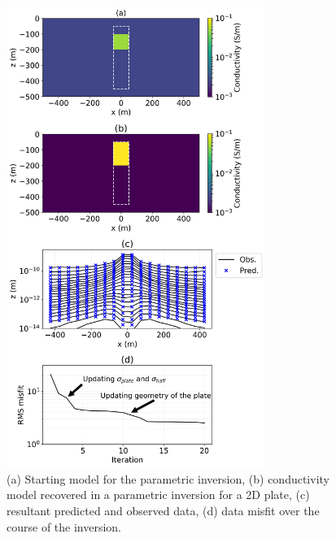 \documentclass[paper]{geophysics}
\begin{document}
\begin{figure}[!htb]
  \centering
  \includegraphics[width=0.75\textwidth]{figures/2Dparametric_inversion.png}
  \caption{(a) Starting model for the parametric inversion, (b) conductivity model recovered in a parametric inversion for a 2D plate, (c) resultant predicted and observed data, (d) data misfit over the course of the inversion.}
  \label{fig:2Dparametric_inversion}
\end{figure}
\end{document}
